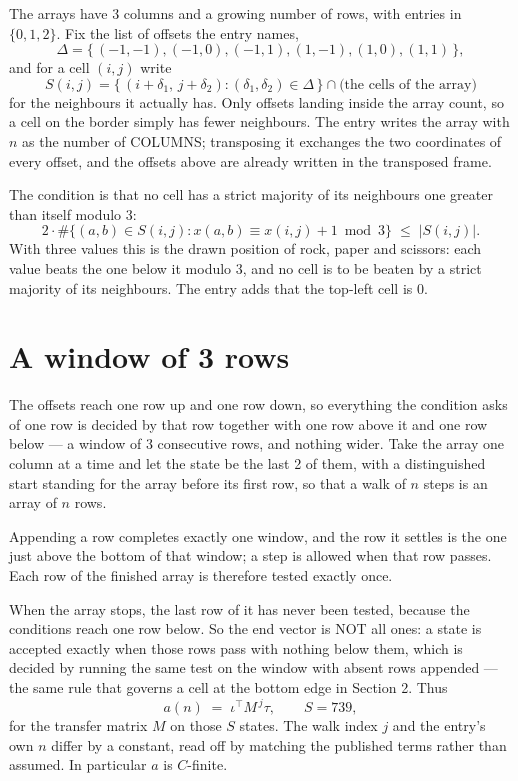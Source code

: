 \documentclass[11pt,a4paper]{article}
\theoremstyle{plain}
\theoremstyle{definition}
\begin{document}
The arrays have $3$ columns and a growing number of rows, with entries in $\{0,1,2\}$. Fix the
list of offsets the entry names,
\[
\Delta=\{\,(-1,-1), (-1,0), (-1,1), (1,-1), (1,0), (1,1)\,\},
\]
and for a cell $(i,j)$ write
\[
S(i,j)=\{\,(i+\delta_1,\,j+\delta_2) : (\delta_1,\delta_2)\in\Delta\,\}\cap
\text{(the cells of the array)}
\]
for the neighbours it actually has. Only offsets landing inside the array count, so a cell on
the border simply has fewer neighbours. The entry writes the array with $n$ as the number of COLUMNS; transposing it exchanges the two coordinates of every offset, and the offsets above are already written in the transposed frame.

The condition is that no cell has a strict majority of its neighbours one greater than itself modulo $3$:
\[
2\cdot\#\{(a,b)\in S(i,j) : x(a,b)\equiv x(i,j)+1 \bmod 3\}\;\le\;|S(i,j)| .
\]
With three values this is the drawn position of rock, paper and scissors: each value beats the one below it modulo $3$, and no cell is to be beaten by a strict majority of its neighbours. The entry adds that the top-left cell is $0$.

\section{A window of 3 rows}

The offsets reach one row up and one row down, so everything the condition asks of one row is
decided by that row together with one row above it and one row below --- a window of
$3$ consecutive rows, and nothing wider. Take the array one column at a time
and let the state be the last 2 of them, with a distinguished start standing for the
array before its first row, so that a walk of $n$ steps is an array of $n$ rows.

Appending a row completes exactly one window, and the row it settles is the one just above the bottom of that window; a step is
allowed when that row passes. Each row of the finished
array is therefore tested exactly once.

When the array stops, the last row of it has never been tested, because the
conditions reach one row below. So the end vector is NOT all ones: a state is accepted exactly when
those rows pass with nothing below them, which is decided by running the same test on the window
with absent rows appended --- the same rule that governs a cell at the bottom edge in
Section 2.
Thus
\[
a(n)\;=\;\iota^{\!\top}M^{\,j}\tau ,\qquad S=739,
\]
for the transfer matrix $M$ on those $S$ states. The walk index $j$ and the entry's own $n$
differ by a constant, read off by matching the published terms rather than assumed. In
particular $a$ is $C$-finite.
\end{document}
